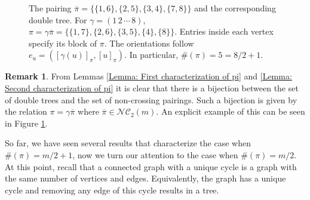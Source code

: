 \documentclass{article}
\theoremstyle{definition}
\newtheorem{remark}     [theorem]{Remark}
\newcommand{\NC}{\mathcal{NC}}
\begin{document}
{\begin{figure}[htbp]
\begin{minipage}{0.53\linewidth}
\end{minipage}

\caption{The pairing
$\overline{\pi}
=\{\{1,6\},\{2,5\},\{3,4\},\{7,8\}\}$
and the corresponding double tree.
For $\gamma=(1\,2\,\cdots\,8)$,
$\pi=\gamma\overline{\pi}
=\{\{1,7\},\{2,6\},\{3,5\},\{4\},\{8\}\}$.
Entries inside each vertex specify its block of $\pi$.
The orientations follow
$e_u=([\gamma(u)]_\pi,[u]_\pi)$.
In particular, $\#(\pi)=5=8/2+1$.}
\label{fig:double-tree-pairing}
\end{figure}

\begin{remark}\label{Remark: Relation double tree and non-crossing pairings}
From Lemmas \ref{Lemma: First characterization of pi} and \ref{Lemma: Second characterization of pi} it is clear that there is a bijection between the set of double trees and the set of non-crossing pairings. Such a bijection is given by the relation $\pi=\gamma\overline{\pi}$ where $\overline{\pi}\in \NC_2(m)$. An explicit example of this can be seen in Figure \ref{fig:double-tree-pairing}.
\end{remark}

So far, we have seen several results that characterize the case when $\#(\pi)=m/2+1$, now we turn our attention to the case when $\#(\pi)=m/2$. At this point, recall that a connected graph with a unique cycle is a graph with the same number of vertices and edges. Equivalently, the graph has a unique cycle and removing any edge of this cycle results in a tree.

}
\end{document}
